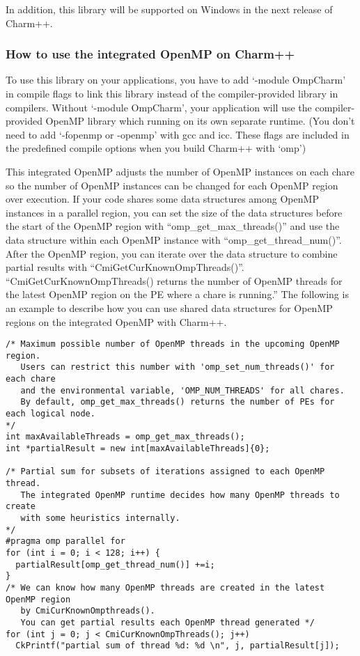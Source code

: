 In addition, this library will be supported on Windows in the next release of Charm++.

\subsubsection{How to use the integrated OpenMP on Charm++}

To use this library on your applications, you have to add `-module OmpCharm' in compile flags
to link this library instead of the compiler-provided library in compilers. Without `-module OmpCharm',
your application will use the compiler-provided OpenMP library which running on its own separate runtime.
(You don't need to add `-fopenmp or -openmp' with gcc and icc. These flags are included
in the predefined compile options when you build Charm++ with `omp')

This integrated OpenMP adjusts the number of OpenMP instances on each chare so the number of
OpenMP instances can be changed for each OpenMP region over execution.
If your code shares some data structures among OpenMP instances in a parallel region, you can set the size of
the data structures before the start of the OpenMP region with ``omp\_get\_max\_threads()''
and use the data structure within each OpenMP instance with ``omp\_get\_thread\_num()''.
After the OpenMP region, you can iterate over the data structure to combine partial results
with ``CmiGetCurKnownOmpThreads()''. ``CmiGetCurKnownOmpThreads() returns the number of OpenMP
threads for the latest OpenMP region on the PE where a chare is running.'' The following is an
example to describe how you can use shared data structures for OpenMP regions on the integrated
OpenMP with Charm++.
\begin{verbatim}
/* Maximum possible number of OpenMP threads in the upcoming OpenMP region.
   Users can restrict this number with 'omp_set_num_threads()' for each chare
   and the environmental variable, 'OMP_NUM_THREADS' for all chares.
   By default, omp_get_max_threads() returns the number of PEs for each logical node.
*/
int maxAvailableThreads = omp_get_max_threads();
int *partialResult = new int[maxAvailableThreads]{0};

/* Partial sum for subsets of iterations assigned to each OpenMP thread.
   The integrated OpenMP runtime decides how many OpenMP threads to create
   with some heuristics internally.
*/
#pragma omp parallel for
for (int i = 0; i < 128; i++) {
  partialResult[omp_get_thread_num()] +=i;
}
/* We can know how many OpenMP threads are created in the latest OpenMP region
   by CmiCurKnownOmpthreads().
   You can get partial results each OpenMP thread generated */
for (int j = 0; j < CmiCurKnownOmpThreads(); j++)
  CkPrintf("partial sum of thread %d: %d \n", j, partialResult[j]);
\end{verbatim}

